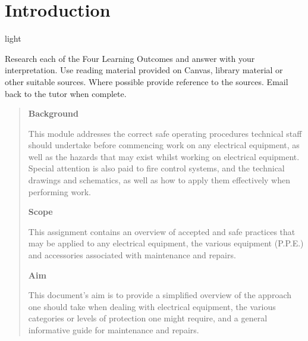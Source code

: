 \documentclass[11pt,a4paper]{article}
\begin{document}
\tableofcontents
\newpage

\section*{Introduction}light
\begin{tcolorbox}[colback=red!5!white,colframe=red!75!black,title=\textbf{Brief}]
Research each of the Four Learning Outcomes and answer with your interpretation.
Use reading material provided on Canvas, library material or other suitable sources. Where possible provide reference to the sources. Email back to the tutor when complete.
\end{tcolorbox}
\begin{abstract}
\textbf{Background}

This module addresses the correct safe operating procedures technical staff should undertake before commencing work on any electrical equipment, as well as the hazards that may exist whilst working on electrical equipment. Special attention is also paid to fire control systems, and the technical drawings and schematics, as well as how to apply them effectively when performing work.

\textbf{Scope}

This assignment contains an overview of accepted and safe practices that may be applied to any electrical equipment, the various equipment (P.P.E.) and accessories associated with maintenance and repairs.

\textbf{Aim}

This document's aim is to provide a simplified overview of the approach one should take when dealing with electrical equipment, the various categories or levels of protection one might require, and a general informative guide for maintenance and repairs.
\end{abstract}
\newpage
\end{document}
